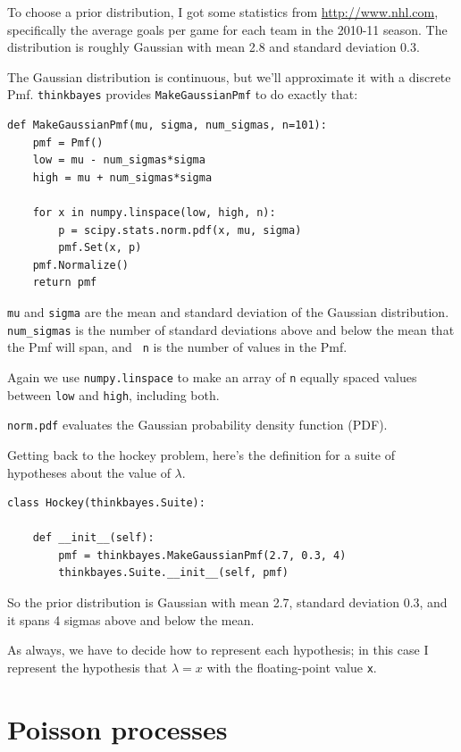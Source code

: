 \documentclass[12pt]{book}
\begin{document}
To choose a prior distribution, I got some statistics from
\url{http://www.nhl.com}, specifically the average goals per game
for each team in the 2010-11 season.  The distribution is roughly
Gaussian with mean 2.8 and standard deviation 0.3.

The Gaussian distribution is continuous, but we'll approximate it with
a discrete Pmf.  \verb"thinkbayes" provides \verb"MakeGaussianPmf" to
do exactly that:

\begin{verbatim}
def MakeGaussianPmf(mu, sigma, num_sigmas, n=101):
    pmf = Pmf()
    low = mu - num_sigmas*sigma
    high = mu + num_sigmas*sigma

    for x in numpy.linspace(low, high, n):
        p = scipy.stats.norm.pdf(x, mu, sigma)
        pmf.Set(x, p)
    pmf.Normalize()
    return pmf
\end{verbatim}  

{\tt mu} and {\tt sigma} are the mean and standard deviation of the
Gaussian distribution.  \verb"num_sigmas" is the number of standard
deviations above and below the mean that the Pmf will span, and {\tt
  n} is the number of values in the Pmf.

Again we use {\tt numpy.linspace} to make an array of {\tt n}
equally spaced values between {\tt low} and {\tt high}, including
both.

\verb"norm.pdf" evaluates the Gaussian probability density function (PDF).

Getting back to the hockey problem, here's the definition for a suite
of hypotheses about the value of $\lambda$.

\begin{verbatim}
class Hockey(thinkbayes.Suite):

    def __init__(self):
        pmf = thinkbayes.MakeGaussianPmf(2.7, 0.3, 4)
        thinkbayes.Suite.__init__(self, pmf)
\end{verbatim}  

So the prior distribution is Gaussian with mean 2.7, standard deviation
0.3, and it spans 4 sigmas above and below the mean.

As always, we have to decide how to represent each hypothesis; in
this case I represent the hypothesis that $\lambda=x$ with the
floating-point value {\tt x}. 


\section{Poisson processes}
\end{document}
